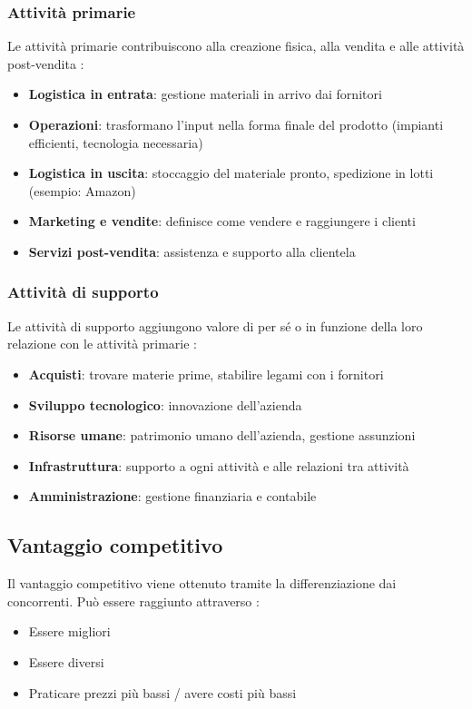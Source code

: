 \documentclass[12pt,a4paper]{article}
\begin{document}
\subsubsection{Attività primarie}
Le attività primarie contribuiscono alla creazione fisica, alla vendita e alle attività post-vendita :

\begin{itemize}
    \item \textbf{Logistica in entrata}: gestione materiali in arrivo dai fornitori
    \item \textbf{Operazioni}: trasformano l'input nella forma finale del prodotto (impianti efficienti, tecnologia necessaria)
    \item \textbf{Logistica in uscita}: stoccaggio del materiale pronto, spedizione in lotti (esempio: Amazon)
    \item \textbf{Marketing e vendite}: definisce come vendere e raggiungere i clienti
    \item \textbf{Servizi post-vendita}: assistenza e supporto alla clientela
\end{itemize}

\subsubsection{Attività di supporto}
Le attività di supporto aggiungono valore di per sé o in funzione della loro relazione con le attività primarie :

\begin{itemize}
    \item \textbf{Acquisti}: trovare materie prime, stabilire legami con i fornitori
    \item \textbf{Sviluppo tecnologico}: innovazione dell'azienda
    \item \textbf{Risorse umane}: patrimonio umano dell'azienda, gestione assunzioni
    \item \textbf{Infrastruttura}: supporto a ogni attività e alle relazioni tra attività
    \item \textbf{Amministrazione}: gestione finanziaria e contabile
\end{itemize}

\subsection{Vantaggio competitivo}
Il vantaggio competitivo viene ottenuto tramite la differenziazione dai concorrenti. Può essere raggiunto attraverso :
\begin{itemize}
    \item Essere migliori
    \item Essere diversi
    \item Praticare prezzi più bassi / avere costi più bassi
\end{itemize}
\end{document}
